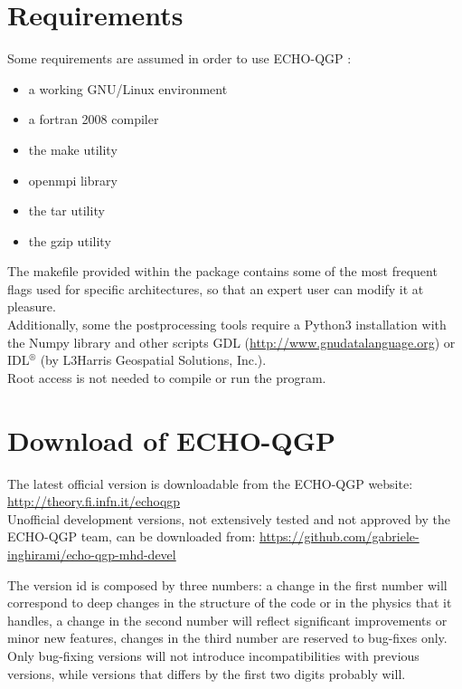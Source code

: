 \section{Requirements}
Some requirements are assumed in order to use ECHO-QGP \vnumber:
\begin{itemize}
 \item a working GNU/Linux environment
 \item a fortran 2008 compiler
 \item the make utility
 \item openmpi library 
 \item the tar utility
 \item the gzip utility
\end{itemize}

The makefile provided within the package contains some of the most frequent flags used for specific 
architectures, so that an expert user can modify it at pleasure.\\

Additionally, some the postprocessing tools require a Python3 installation with the Numpy library and other scripts GDL (\url{http://www.gnudatalanguage.org}) or IDL$^\circledR$ (by L3Harris Geospatial Solutions, Inc.). \\

Root access is not needed to compile or run the program.\\

\section{Download of ECHO-QGP}
The latest official version is downloadable from the ECHO-QGP website: 
\url{http://theory.fi.infn.it/echoqgp}\\
Unofficial development versions, not extensively tested and not approved by the ECHO-QGP team, can be downloaded from:
\url{https://github.com/gabriele-inghirami/echo-qgp-mhd-devel}

The version id is composed by three numbers: a change in the first number will correspond to deep changes in the structure of the code or in the physics that it handles, a change in the second number will reflect significant improvements or minor new features, changes in the third number are reserved to bug-fixes only.\\
Only bug-fixing versions will not introduce incompatibilities with previous versions, while versions that differs by the first two digits probably will.\\

